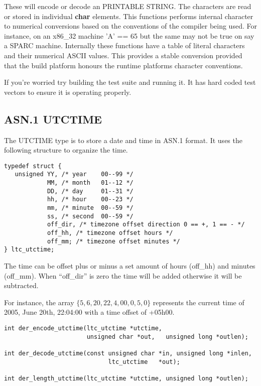 \documentclass[a4paper]{book}
\begin{document}
These will encode or decode an PRINTABLE STRING.  The characters are read or stored in individual \textbf{char} elements.  This functions performs internal character
to numerical conversions based on the conventions of the compiler being used.  For instance, on an x86\_32 machine 'A' == 65 but the same may not be true on 
say a SPARC machine.  Internally these functions have a table of literal characters and their numerical ASCII values.  This provides a stable conversion provided
that the build platform honours the runtime platforms character conventions.

If you're worried try building the test suite and running it.  It has hard coded test vectors to ensure it is operating properly. 

\subsection{ASN.1 UTCTIME}

The UTCTIME type is to store a date and time in ASN.1 format.  It uses the following structure to organize the time.

\begin{verbatim}
typedef struct {
   unsigned YY, /* year    00--99 */
            MM, /* month   01--12 */
            DD, /* day     01--31 */
            hh, /* hour    00--23 */
            mm, /* minute  00--59 */
            ss, /* second  00--59 */
            off_dir, /* timezone offset direction 0 == +, 1 == - */
            off_hh, /* timezone offset hours */
            off_mm; /* timezone offset minutes */
} ltc_utctime;
\end{verbatim}

The time can be offset plus or minus a set amount of hours (off\_hh) and minutes (off\_mm).  When ``off\_dir'' is zero the time will be added otherwise it 
will be subtracted.  

For instance, the array $\lbrace 5, 6, 20, 22, 4, 00, 0, 5, 0 \rbrace$ represents the current time of 2005, June 20th, 22:04:00 with a time offset of +05h00.  

\begin{verbatim}
int der_encode_utctime(ltc_utctime *utctime, 
                       unsigned char *out,   unsigned long *outlen);

int der_decode_utctime(const unsigned char *in, unsigned long *inlen,
                             ltc_utctime   *out);

int der_length_utctime(ltc_utctime *utctime, unsigned long *outlen);
\end{verbatim}
\end{document}
